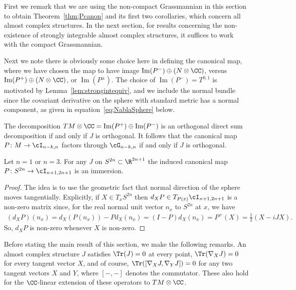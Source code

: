 First we remark that we are using the non-compact Grassmannian in this section to obtain Theorem~\ref{thm;Pcanon} and its first two corollaries, which concern all almost complex structures. In the next section, for results concerning the non-existence of strongly integrable almost complex structures, it suffices to work with the compact Grassmannian.

Next we note there is obviously some choice here in defining the canonical map, where we have chosen the map to have image $\operatorname{Im}(P^-) \oplus ( N \otimes \CC )$, versus $\operatorname{Im}(P^+) \oplus ( N \otimes \CC )$, or $\operatorname{Im}(P^\pm)$. The choice of $\operatorname{Im}(P^-)= T^{0,1}$ is motivated by Lemma~\ref{lem:strongintequiv}, and we include the normal bundle since the covariant derivative on the sphere with standard metric has a normal component, as given in equation~\eqref{eq;NablaSphere} below.

\begin{rmk}The decomposition $TM \otimes \CC = \operatorname{Im}(P^+) \oplus \operatorname{Im}(P^-)$ is an orthogonal direct sum decomposition if and only if $J$ is orthogonal. It follows that the canonical map $P\colon M \to \cI_{n-k,n}$ factors through $\cG_{n-k,n}$ if and only if $J$ is orthogonal.
\end{rmk}

\begin{lem} \label{lem;Pcanonemb}
Let $n=1$ or $n=3$. For any $J$ on $S^{2n} \subset \R^{2n+1}$ the induced canonical map $P\colon S^{2n} \to \cI_{n+1,2n+1}$ is an immersion.
\end{lem}

\begin{proof} The idea is to use the geometric fact that normal direction of the sphere moves tangentially. Explicitly, if $X \in T_xS^{2n}$ then $d_X P \in T_{P(x)} \cI_{n+1,2n+1}$ is a non-zero matrix since, for the real normal unit vector $n_x$ to $S^{2n}$ at $x$, we have
\begin{gather*}
(d_XP)(n_x) = d_X(P(n_x)) - P d_X(n_x) = (I-P) d_X(n_x) = P^+(X) = \frac 1 2 (X - i J X).
\end{gather*}
So, $d_X P$ is non-zero whenever $X$ is non-zero.
\end{proof}

Before stating the main result of this section, we make the following remarks. An almost complex structure $J$ satisfies $\Tr(J)=0$ at every point, $\Tr(\nabla_X J) =0$ for every tangent vector $X$, and of course, $\Tr ([\nabla_X J, \nabla_Y J] )=0$ for any two tangent vectors $X$ and $Y$, where $[-,-]$ denotes the commutator. These also hold for the $\CC$-linear extension of these operators to $TM \otimes \CC$.

